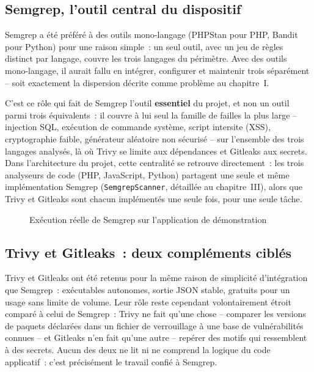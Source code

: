 \documentclass[12pt,a4paper,oneside]{report}
\begin{document}
\subsection{Semgrep, l'outil central du dispositif}
Semgrep a \'et\'e pr\'ef\'er\'e \`a des outils mono-langage (PHPStan pour PHP, Bandit pour Python) pour une raison simple~: un seul outil, avec un jeu de r\`egles distinct par langage, couvre les trois langages du p\'erim\`etre. Avec des outils mono-langage, il aurait fallu en int\'egrer, configurer et maintenir trois s\'epar\'ement -- soit exactement la dispersion d\'ecrite comme probl\`eme au chapitre~I.

C'est ce r\^ole qui fait de Semgrep l'outil \textbf{essentiel} du projet, et non un outil parmi trois \'equivalents~: il couvre \`a lui seul la famille de failles la plus large -- injection SQL, ex\'ecution de commande syst\`eme, script intersite (XSS), cryptographie faible, g\'en\'erateur al\'eatoire non s\'ecuris\'e -- sur l'ensemble des trois langages analys\'es, l\`a o\`u Trivy se limite aux d\'ependances et Gitleaks aux secrets. Dans l'architecture du projet, cette centralit\'e se retrouve directement~: les trois analyseurs de code (PHP, JavaScript, Python) partagent une seule et m\^eme impl\'ementation Semgrep (\texttt{SemgrepScanner}, d\'etaill\'ee au chapitre~III), alors que Trivy et Gitleaks sont chacun impl\'ement\'es une seule fois, pour une seule t\^ache.

\begin{figure}[H]
\centering
{}
\caption{Ex\'ecution r\'eelle de Semgrep sur l'application de d\'emonstration}
\label{fig:semgrep-run}
\end{figure}

\subsection{Trivy et Gitleaks~: deux compl\'ements cibl\'es}
Trivy et Gitleaks ont \'et\'e retenus pour la m\^eme raison de simplicit\'e d'int\'egration que Semgrep~: ex\'ecutables autonomes, sortie JSON stable, gratuits pour un usage sans limite de volume. Leur r\^ole reste cependant volontairement \'etroit compar\'e \`a celui de Semgrep~: Trivy ne fait qu'une chose -- comparer les versions de paquets d\'eclar\'ees dans un fichier de verrouillage \`a une base de vuln\'erabilit\'es connues -- et Gitleaks n'en fait qu'une autre -- rep\'erer des motifs qui ressemblent \`a des secrets. Aucun des deux ne lit ni ne comprend la logique du code applicatif~: c'est pr\'ecis\'ement le travail confi\'e \`a Semgrep.
\end{document}
